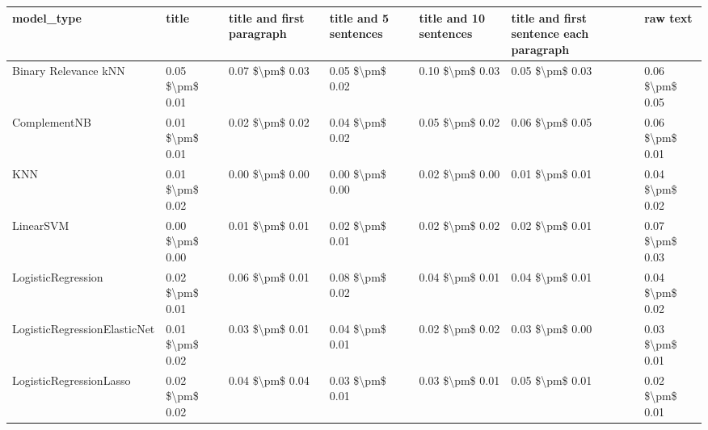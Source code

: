 \begin{tabular}{lllllll}
\toprule
                     model\_type &           title & title and first paragraph & title and 5 sentences & title and 10 sentences & title and first sentence each paragraph &            raw text \\
\midrule
           Binary Relevance kNN & 0.05 \$\textbackslash pm\$ 0.01 &           0.07 \$\textbackslash pm\$ 0.03 &       0.05 \$\textbackslash pm\$ 0.02 &        0.10 \$\textbackslash pm\$ 0.03 &                         0.05 \$\textbackslash pm\$ 0.03 &     0.06 \$\textbackslash pm\$ 0.05 \\
                   ComplementNB & 0.01 \$\textbackslash pm\$ 0.01 &           0.02 \$\textbackslash pm\$ 0.02 &       0.04 \$\textbackslash pm\$ 0.02 &        0.05 \$\textbackslash pm\$ 0.02 &                         0.06 \$\textbackslash pm\$ 0.05 &     0.06 \$\textbackslash pm\$ 0.01 \\
                            KNN & 0.01 \$\textbackslash pm\$ 0.02 &           0.00 \$\textbackslash pm\$ 0.00 &       0.00 \$\textbackslash pm\$ 0.00 &        0.02 \$\textbackslash pm\$ 0.00 &                         0.01 \$\textbackslash pm\$ 0.01 &     0.04 \$\textbackslash pm\$ 0.02 \\
                      LinearSVM & 0.00 \$\textbackslash pm\$ 0.00 &           0.01 \$\textbackslash pm\$ 0.01 &       0.02 \$\textbackslash pm\$ 0.01 &        0.02 \$\textbackslash pm\$ 0.02 &                         0.02 \$\textbackslash pm\$ 0.01 &     0.07 \$\textbackslash pm\$ 0.03 \\
             LogisticRegression & 0.02 \$\textbackslash pm\$ 0.01 &           0.06 \$\textbackslash pm\$ 0.01 &       0.08 \$\textbackslash pm\$ 0.02 &        0.04 \$\textbackslash pm\$ 0.01 &                         0.04 \$\textbackslash pm\$ 0.01 &     0.04 \$\textbackslash pm\$ 0.02 \\
   LogisticRegressionElasticNet & 0.01 \$\textbackslash pm\$ 0.02 &           0.03 \$\textbackslash pm\$ 0.01 &       0.04 \$\textbackslash pm\$ 0.01 &        0.02 \$\textbackslash pm\$ 0.02 &                         0.03 \$\textbackslash pm\$ 0.00 &     0.03 \$\textbackslash pm\$ 0.01 \\
        LogisticRegressionLasso & 0.02 \$\textbackslash pm\$ 0.02 &           0.04 \$\textbackslash pm\$ 0.04 &       0.03 \$\textbackslash pm\$ 0.01 &        0.03 \$\textbackslash pm\$ 0.01 &                         0.05 \$\textbackslash pm\$ 0.01 &     0.02 \$\textbackslash pm\$ 0.01 \\

\end{tabular}
